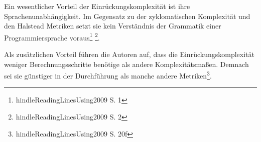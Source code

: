 Ein wesentlicher Vorteil der Einrückungskomplexität ist ihre
Sprachenunabhängigkeit. Im Gegensatz zu der zyklomatischen Komplexität
und den Halstead Metriken setzt sie kein Verständnis der Grammatik einer
Programmiersprache voraus\footnote{hindleReadingLinesUsing2009 S. 1}
\footnote{hindleReadingLinesUsing2009 S. 2}.

Als zusätzlichen Vorteil führen die Autoren auf, dass die
Einrückungskomplexität weniger Berechnungsschritte benötige als andere
Komplexitätsmaßen. Demnach sei sie günstiger in der Durchführung als
manche andere Metriken\footnote{hindleReadingLinesUsing2009 S. 20f}.